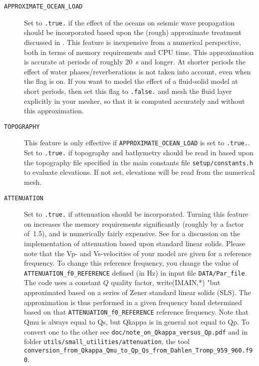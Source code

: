 \begin{description}
\item [{\texttt{APPROXIMATE\_OCEAN\_LOAD}}] Set to \texttt{.true.} if the
effect of the oceans on seismic wave propagation should be incorporated
based upon the (rough) approximate treatment discussed in \citet{KoTr02b}.
This feature is inexpensive from a numerical perspective, both in
terms of memory requirements and CPU time. This approximation is accurate
at periods of roughly 20~s and longer. At shorter periods the effect
of water phases/reverberations is not taken into account, even when
the flag is on. If you want to model the effect of a fluid-solid model
at short periods, then set this flag to \texttt{.false.} and mesh
the fluid layer explicitly in your mesher, so that it is computed
accurately and without this approximation.
\item [{\texttt{TOPOGRAPHY}}] This feature is only effective if \texttt{APPROXIMATE\_OCEAN\_LOAD}
is set to \texttt{.true.}. Set to \texttt{.true.} if topography and
bathymetry should be read in based upon the topography file specified
in the main constants file \texttt{setup/constants.h} to evaluate elevations. If not set, elevations
will be read from the numerical mesh.
\item [{\texttt{ATTENUATION}}] Set to \texttt{.true.} if attenuation should
be incorporated. Turning this feature on increases the memory requirements
significantly (roughly by a factor of~1.5), and is numerically fairly
expensive. See \citet{KoTr99,KoTr02a} for a discussion on the implementation
of attenuation based upon standard linear solids. Please note that
the Vp- and Vs-velocities of your model are given for a reference
frequency. To change this reference frequency, you change the value
of \texttt{ATTENUATION\_f0\_REFERENCE} defined (in Hz) in input file \texttt{DATA/Par\_file}.
The code uses a constant $Q$ quality factor, write(IMAIN,*) "but approximated based on a series of Zener standard linear solids (SLS).
The approximation is thus performed in a given frequency band determined based on that \texttt{ATTENUATION\_f0\_REFERENCE} reference frequency.
Note that Qmu is always equal to Qs, but Qkappa is in general not equal to Qp.
To convert one to the other see \texttt{doc/note\_on\_Qkappa\_versus\_Qp.pdf}
and in folder \texttt{utils/small\_utilities/attenuation}, the tool
\texttt{conversion\_from\_Qkappa\_Qmu\_to\_Qp\_Qs\_from\_Dahlen\_Tromp\_959\_960.f90}.


\end{description}
